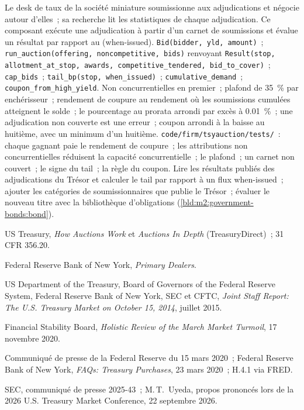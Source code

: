 \begin{build}
 Le desk de taux de la société miniature soumissionne aux adjudications et négocie
autour d'elles~; sa recherche lit les statistiques de chaque adjudication. Ce composant
exécute une adjudication à partir d'un carnet de soumissions et évalue un résultat par rapport
au  (when-issued).
 \texttt{Bid(bidder, yld, amount)}~;
\texttt{run\_auction(offering, noncompetitive, bids)} renvoyant \texttt{Result(stop, allotment\_at\_stop, awards, competitive\_tendered,
bid\_to\_cover)}~; \texttt{cap\_bids}~; \texttt{tail\_bp(stop, when\_issued)}~;
\texttt{cumulative\_demand}~; \texttt{coupon\_from\_high\_yield}.
 Non concurrentielles en premier~; plafond de 35~\% par enchérisseur~; rendement de coupure au
rendement où les soumissions cumulées atteignent le solde~; le pourcentage au prorata arrondi
par excès à 0.01~\%~; une adjudication non couverte est une erreur~; coupon arrondi à la baisse au
huitième, avec un minimum d'un huitième.
 \texttt{code/firm/tsyauction/tests/}~: chaque gagnant
paie le rendement de coupure~; les attributions non concurrentielles réduisent la capacité concurrentielle~; le
plafond~; un carnet non couvert~; le signe du tail~; la règle du coupon.
 Lire les résultats publiés des adjudications du Trésor et calculer
le tail par rapport à un flux when-issued~; ajouter les catégories de soumissionnaires que publie le
Trésor~; évaluer le nouveau titre avec la bibliothèque d'obligations
(\cref{bld:m2:government-bonds:bond}).
\end{build}

\begin{omsources}
\item US Treasury, \emph{How Auctions Work} et \emph{Auctions In Depth}
(TreasuryDirect)~; 31 CFR 356.20.
\item Federal Reserve Bank of New York, \emph{Primary Dealers}. \item US Department of the Treasury, Board of Governors of the Federal
Reserve System, Federal Reserve Bank of New York, SEC et CFTC, \emph{Joint
Staff Report: The U.S. Treasury Market on October 15, 2014}, juillet 2015. \item Financial Stability Board, \emph{Holistic Review of the March Market
Turmoil}, 17 novembre 2020.
\item Communiqué de presse de la Federal Reserve du 15 mars 2020~; Federal Reserve Bank of
New York, \emph{FAQs: Treasury Purchases}, 23 mars 2020~; H.4.1 via FRED.
\item SEC, communiqué de presse 2025-43~; M.\,T.\ Uyeda, propos prononcés lors de la
2026 U.S. Treasury Market Conference, 22 septembre 2026.
\end{omsources}

